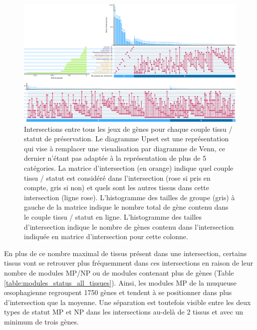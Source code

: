 \begin{landscape}
\begin{figure}[p]
  \centering
  \includegraphics[width=1.5\textheight]{img/chap2/chap2_upset_genes_unpres_modpres_by_tissue.pdf}
  \caption[Intersections entre tous les jeux de gènes pour chaque couple tissu / statut de préservation]{Intersections entre tous les jeux de gènes pour chaque couple tissu / statut de préservation. Le diagramme Upset est une représentation qui vise à remplacer une visualisation par diagramme de Venn, ce dernier n'étant pas adaptée à la représentation de plus de 5 catégories. La matrice d'intersection (en orange) indique quel couple tissu / statut est considéré dans l'intersection (rose si pris en compte, gris si non) et quels sont les autres tissus dans cette intersection (ligne rose). L'histogramme des tailles de groupe (gris) à gauche de la matrice indique le nombre total de gène contenu dans le couple tissu / statut en ligne. L'histogramme des tailles d'intersection indique le nombre de gènes contenu dans l'intersection indiquée en matrice d'intersection pour cette colonne.}
  \label{figure:upset_intersection_genes_tissu_unpres_modpres}
\end{figure}
\end{landscape}

En plus de ce nombre maximal de tissus présent dans une intersection, certains tissus vont se retrouver plus fréquemment dans ces intersections en raison de leur nombre de modules MP/NP ou de modules contenant plus de gènes (Table \ref{table:modules_status_all_tissues}). Ainsi, les modules MP de la muqueuse œsophagienne regroupent 1750 gènes et tendent à se positionner dans plus d'intersection que la moyenne. Une séparation est toutefois visible entre les deux types de statut MP et NP dans les intersections au-delà de 2 tissus et avec un minimum de trois gènes.


